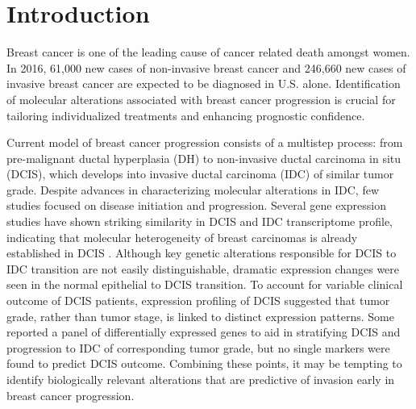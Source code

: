 \documentclass[10pt,letterpaper]{article}
\begin{document}
\section*{Introduction}
Breast cancer is one of the leading cause of cancer related death amongst women. In 2016, 61,000 new cases of non-invasive breast cancer and 246,660 new cases of invasive breast cancer are expected to be diagnosed in U.S. alone. \cite{1_siegel_miller_jemal_2016} Identification of molecular alterations associated with breast cancer progression is crucial for tailoring individualized treatments and enhancing prognostic confidence.

Current model of breast cancer progression consists of a multistep process: from pre-malignant ductal hyperplasia (DH) to non-invasive ductal carcinoma in situ (DCIS), which develops into invasive ductal carcinoma (IDC) of similar tumor grade. \cite{2_bombonati_sgroi_2010} Despite advances in characterizing molecular alterations in IDC, few studies focused on disease initiation and progression. Several gene expression studies have shown striking similarity in DCIS and IDC transcriptome profile, indicating that molecular heterogeneity of breast carcinomas is already established in DCIS \cite{3_ma_salunga_tuggle_gaudet_enright_mcquary_payette_pistone_stecker_zhang,10_porter_lahti-domenici_keshaviah_bae_argani_marks_richardson_cooper_strausberg_riggins}. Although key genetic alterations responsible for DCIS to IDC transition are not easily distinguishable, dramatic expression changes were seen in the normal epithelial to DCIS transition. \cite{10_porter_lahti-domenici_keshaviah_bae_argani_marks_richardson_cooper_strausberg_riggins} To account for variable clinical outcome of DCIS patients, expression profiling of DCIS suggested that tumor grade, rather than tumor stage, is linked to distinct expression patterns. \cite{3_ma_salunga_tuggle_gaudet_enright_mcquary_payette_pistone_stecker_zhang} Some reported a panel of differentially expressed genes to aid in stratifying DCIS and progression to IDC of corresponding tumor grade, but no single markers were found to predict DCIS outcome. \cite{9_hannemann_velds_halfwerk_kreike_peterse_van} Combining these points, it may be tempting to identify biologically relevant alterations that are predictive of invasion early in breast cancer progression.
\end{document}

